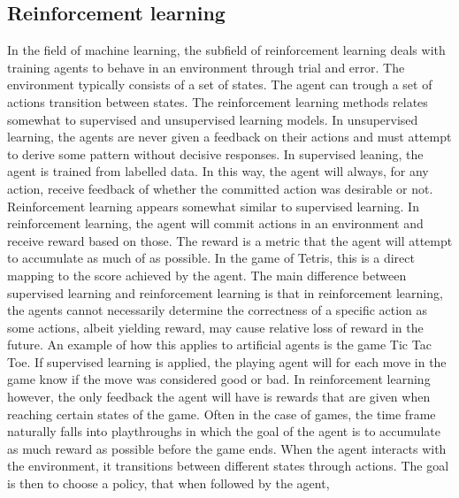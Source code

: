 \subsection{Reinforcement learning \label{RL}}

In the field of machine learning, the subfield of reinforcement learning
deals with training agents to behave in an environment through
trial and error. The environment typically consists of a set of states.
The agent can trough a set of actions transition between states.
The reinforcement learning methods relates somewhat 
to supervised and unsupervised learning models. In unsupervised 
learning, the agents are never given a feedback on their actions
and must attempt to derive some pattern without decisive responses.
In supervised leaning, the agent is trained from labelled data.
In this way, the agent will always, for any action, receive 
feedback of whether the committed action was desirable or not.\\
Reinforcement learning appears somewhat similar to supervised learning.
In reinforcement learning, the agent will commit actions in an environment
and receive reward based on those. The reward is a metric that the agent 
will attempt to accumulate
as much of as possible. In the game of Tetris, this is a direct mapping to 
the score achieved by the agent.
 The main difference between supervised
learning and reinforcement learning is that in reinforcement learning,
the agents cannot necessarily determine the correctness 
of a specific action as some actions, albeit yielding reward,
may cause relative loss of reward in the future. An example of how this applies 
to artificial agents is the game Tic Tac Toe. If supervised learning
is applied, the playing agent will for each move in the game know
if the move was considered good or bad. In reinforcement learning however,
the only feedback the agent will have is rewards that are given 
when reaching certain states of the game. 
Often in the case of games, the 
time frame naturally falls into playthroughs in which the 
goal of the agent is to accumulate as much reward as possible 
before the game ends. When the agent interacts 
with the environment, it transitions between different states through 
actions. 
The goal is then to choose a policy, that when followed by the agent,
